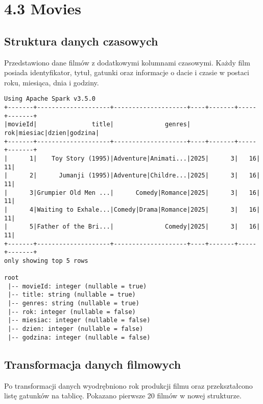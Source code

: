 \documentclass{article}
\begin{document}
\section{4.3 Movies}

\subsection{Struktura danych czasowych}
Przedstawiono dane filmów z dodatkowymi kolumnami czasowymi. Każdy film posiada identyfikator, tytuł, gatunki oraz informacje o dacie i czasie w postaci roku, miesiąca, dnia i godziny.

\begin{verbatim}
Using Apache Spark v3.5.0
+-------+--------------------+--------------------+----+-------+-----+-------+
|movieId|               title|              genres| rok|miesiac|dzien|godzina|
+-------+--------------------+--------------------+----+-------+-----+-------+
|      1|    Toy Story (1995)|Adventure|Animati...|2025|      3|   16|     11|
|      2|      Jumanji (1995)|Adventure|Childre...|2025|      3|   16|     11|
|      3|Grumpier Old Men ...|      Comedy|Romance|2025|      3|   16|     11|
|      4|Waiting to Exhale...|Comedy|Drama|Romance|2025|      3|   16|     11|
|      5|Father of the Bri...|              Comedy|2025|      3|   16|     11|
+-------+--------------------+--------------------+----+-------+-----+-------+
only showing top 5 rows

root
 |-- movieId: integer (nullable = true)
 |-- title: string (nullable = true)
 |-- genres: string (nullable = true)
 |-- rok: integer (nullable = false)
 |-- miesiac: integer (nullable = false)
 |-- dzien: integer (nullable = false)
 |-- godzina: integer (nullable = false)
\end{verbatim}

\subsection{Transformacja danych filmowych}
Po transformacji danych wyodrębniono rok produkcji filmu oraz przekształcono listę gatunków na tablicę. Pokazano pierwsze 20 filmów w nowej strukturze.
\end{document}
